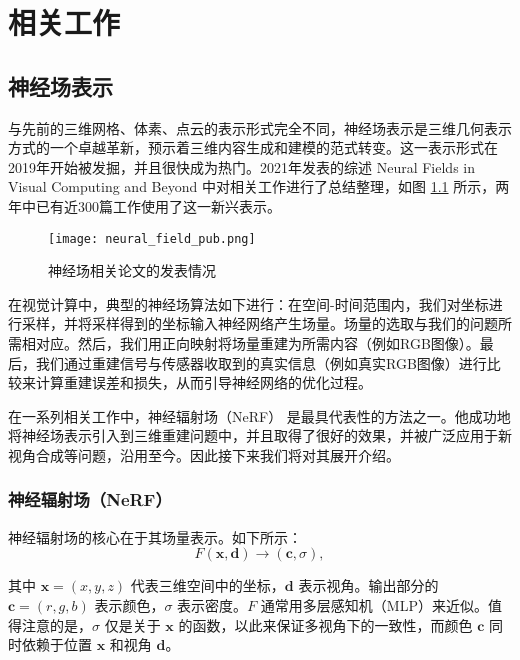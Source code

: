 \chapter{相关工作}

\section{神经场表示}

与先前的三维网格、体素、点云的表示形式完全不同，神经场表示是三维几何表示方式的一个卓越革新，预示着三维内容生成和建模的范式转变。这一表示形式在2019年开始被发掘，并且很快成为热门。2021年发表的综述 Neural Fields in Visual Computing and Beyond \cite{neural_field_summary} 中对相关工作进行了总结整理，如图 \ref{fig:neural_field_pub} 所示，两年中已有近300篇工作使用了这一新兴表示。

\begin{figure}
  \centering
  \texttt{[image: neural\_field\_pub.png]}
  \caption{神经场相关论文的发表情况}
  \label{fig:neural_field_pub}
\end{figure}

在视觉计算中，典型的神经场算法如下进行：在空间-时间范围内，我们对坐标进行采样，并将采样得到的坐标输入神经网络产生场量。场量的选取与我们的问题所需相对应。然后，我们用正向映射将场量重建为所需内容（例如RGB图像）。最后，我们通过重建信号与传感器收取到的真实信息（例如真实RGB图像）进行比较来计算重建误差和损失，从而引导神经网络的优化过程。

在一系列相关工作中，神经辐射场（NeRF）\cite{nerf} 是最具代表性的方法之一。他成功地将神经场表示引入到三维重建问题中，并且取得了很好的效果，并被广泛应用于新视角合成等问题，沿用至今。因此接下来我们将对其展开介绍。

\subsection{神经辐射场（NeRF）}

神经辐射场的核心在于其场量表示。如下所示：
\begin{equation}
  F(\mathbf{x},\mathbf{d})\to(\mathbf{c},\sigma),
\end{equation}

其中 $\mathbf{x}=(x,y,z)$ 代表三维空间中的坐标，$\mathbf{d}$ 表示视角。输出部分的 $\mathbf{c} = (r,g,b)$ 表示颜色，$\sigma$ 表示密度。$F$ 通常用多层感知机（MLP）来近似。值得注意的是，$\sigma$ 仅是关于 $\mathbf{x}$ 的函数，以此来保证多视角下的一致性，而颜色 $\mathbf{c}$ 同时依赖于位置 $\mathbf{x}$ 和视角 $\mathbf{d}$。

